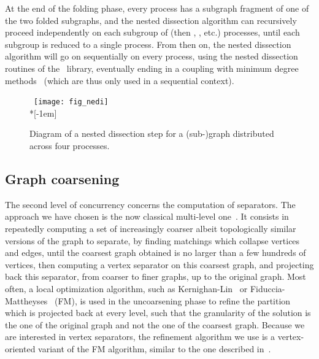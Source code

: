 \documentclass[fleqn,12pt,twoside]{article}
\begin{document}
At the end of the folding phase, every process has a
subgraph fragment of one of the two folded subgraphs, and the nested
dissection algorithm can recursively proceed independently on each
subgroup of  (then , ,
etc\@.) processes, until each subgroup is reduced to a single
process. From then on, the nested dissection algorithm will go on
sequentially on every process, using the nested dissection routines
of the \scotch\ library, eventually ending in a coupling with minimum
degree methods~\cite{peroam00a} (which are thus only used in a
sequential context).

\begin{figure}
~\hfill \texttt{[image: fig\_nedi]}
\hfill~\\*[-1em]
\caption{Diagram of a nested dissection step for a (sub-)graph
  distributed across four processes.}
\label{fig-nedi}
\end{figure}

\subsection{Graph coarsening}
\label{secalgocoarsen}

The second level of concurrency concerns the computation of
separators. The approach we have chosen is the now classical
multi-level one~\cite{basi94,hele95,kaku98a}. It consists in
repeatedly computing a set of increasingly coarser albeit
topologically similar versions of the graph to separate, by finding
matchings which collapse vertices and edges, until the coarsest graph
obtained is no larger than a few hundreds of vertices, then computing
a vertex separator on this coarsest graph, and projecting back this
separator, from coarser to finer graphs, up to the original graph.
Most often, a local optimization algorithm, such as
Kernighan-Lin~\cite{keli70} or Fiduccia-Mattheyses~\cite{fima82} (FM),
is used in the uncoarsening phase to refine the partition which is
projected back at every level, such that the granularity of the
solution is the one of the original graph and not the one of the
coarsest graph. Because we are interested in vertex separators, the
refinement algorithm we use is a vertex-oriented variant of the FM
algorithm, similar to the one described in~\cite{hero98}.
\end{document}
